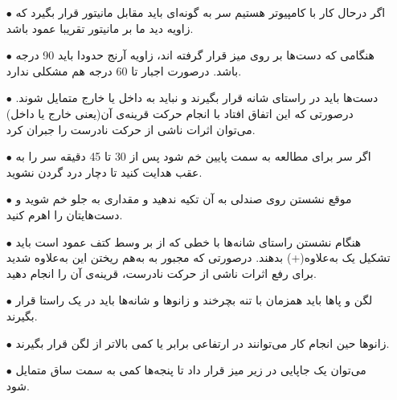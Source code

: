 \documentclass{article}
\begin{document}


\newpage
\begin{itemize}
    \item [$\bullet$]
اگر درحال کار با کامپیوتر هستیم سر به گونه‌ای باید مقابل مانیتور قرار بگیرد که زاویه دید ما بر مانیتور تقریبا عمود باشد.
	\item [$\bullet$]
هنگامی که دست‌ها بر روی میز قرار گرفته اند، زاویه آرنج حدودا باید 90 درجه باشد. درصورت اجبار تا 60 درجه هم مشکلی ندارد.
	\item [$\bullet$]
دست‌ها باید در راستای شانه قرار بگیرند و نباید به داخل یا خارج متمایل شوند. درصورتی که این اتفاق افتاد با انجام حرکت قرینه‌ی آن(یعنی خارج یا داخل) می‌توان اثرات ناشی از حرکت نادرست را جبران کرد.
	\item [$\bullet$]
اگر سر برای مطالعه به سمت پایین خم شود پس از 30 تا 45 دقیقه سر را به عقب هدایت کنید تا دچار درد گردن نشوید.
	\item [$\bullet$]
موقع نشستن روی صندلی به آن تکیه ندهید و مقداری به جلو خم شوید و دست‌هایتان را اهرم کنید.
	\item [$\bullet$]
هنگام نشستن راستای شانه‌ها با خطی که از بر وسط کتف عمود است باید تشکیل یک به‌علاوه(+) بدهند. درصورتی که مجبور به به‌هم ریختن این به‌علاوه شدید برای رفع اثرات ناشی از حرکت نادرست، قرینه‌ی آن را انجام دهید.
	\item [$\bullet$]
لگن و پاها باید همزمان با تنه بچرخند و زانوها و شانه‌ها باید در یک راستا قرار بگیرند.
	\item [$\bullet$]
زانو‌ها حین انجام کار می‌توانند در ارتفاعی برابر یا کمی بالاتر از لگن قرار بگیرند.
	\item [$\bullet$]
می‌توان یک جاپایی در زیر میز قرار داد تا پنجه‌ها کمی به سمت ساق متمایل شود.

\end{itemize}
\end{document}
